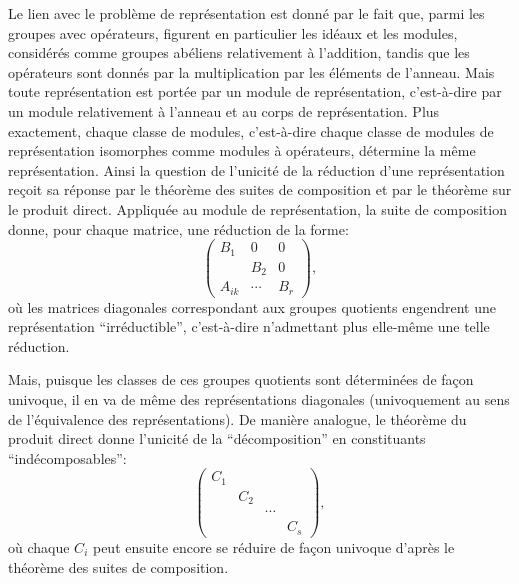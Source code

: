 Le lien avec le problème de représentation est donné par le fait que, parmi les groupes avec opérateurs, figurent en particulier les idéaux et les modules, considérés comme groupes abéliens relativement à l'addition, tandis que les opérateurs sont donnés par la multiplication par les éléments de l'anneau. Mais toute représentation est portée par un module de représentation, c'est-à-dire par un module relativement à l'anneau et au corps de représentation. Plus exactement, chaque classe de modules, c'est-à-dire chaque classe de modules de représentation isomorphes comme modules à opérateurs, détermine la même représentation. Ainsi la question de l'unicité de la réduction d'une représentation reçoit sa réponse par le théorème des suites de composition et par le théorème sur le produit direct. Appliquée au module de représentation, la suite de composition donne, pour chaque matrice, une réduction de la forme:
\[
\begin{pmatrix}
B_1&0&0\\
&B_2&0\\
A_{ik}&\cdots&B_r
\end{pmatrix},
\]
où les matrices diagonales correspondant aux groupes quotients engendrent une représentation ``irréductible'', c'est-à-dire n'admettant plus elle-même une telle réduction.

Mais, puisque les classes de ces groupes quotients sont déterminées de façon univoque, il en va de même des représentations diagonales (univoquement au sens de l'équivalence des représentations). De manière analogue, le théorème du produit direct donne l'unicité de la ``décomposition'' en constituants ``indécomposables'':
\[
\begin{pmatrix}
C_1&&&\\
&C_2&&\\
&&\cdots&\\
&&&C_s
\end{pmatrix},
\]
où chaque $C_i$ peut ensuite encore se réduire de façon univoque d'après le théorème des suites de composition.

